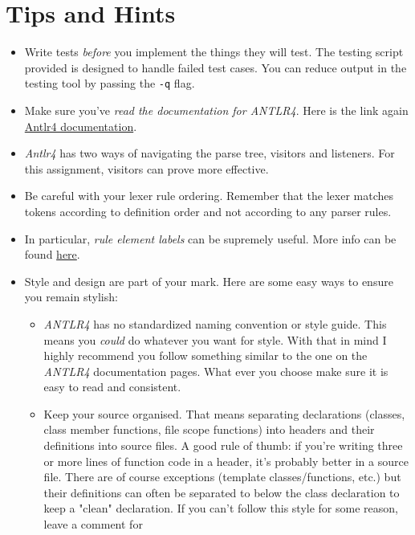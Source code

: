 \documentclass{article}
\newcommand{\code}[1]{\texttt{\textmd{#1}}}
\begin{document}
\section{Tips and Hints}
\begin{itemize}
  \item
    Write tests \textit{before} you implement the things they will test. The testing script
    provided is designed to handle failed test cases. You can reduce output in the testing tool by
    passing the \code{-q} flag.
  \item
    Make sure you've \textit{read the documentation for ANTLR4}. Here is the link again
    \href{https://github.com/antlr/antlr4/blob/master/doc/index.md} {Antlr4 documentation}.
  \item
    \textit{Antlr4} has two ways of navigating the parse tree, visitors and listeners. For this
    assignment, visitors can prove more effective.
  \item
    Be careful with your lexer rule ordering. Remember that the lexer matches tokens according to
    definition order and not according to any parser rules.
  \item
    In particular, \textit{rule element labels} can be supremely useful. More info can be found
    \href{https://github.com/antlr/antlr4/blob/master/doc/parser-rules.md\#alternative-labels}
    {here}.
  \item
    Style and design are part of your mark. Here are some easy ways to ensure you remain stylish:
    \begin{itemize}
    \item
      \textit{ANTLR4} has no standardized naming convention or style guide. This means you
      \textit{could} do whatever you want for style. With that in mind I highly recommend you
      follow something similar to the one on the \textit{ANTLR4} documentation pages. What ever you
      choose make sure it is easy to read and consistent.
    \item
      Keep your source organised. That means separating declarations (classes, class member
      functions, file scope functions) into headers and their definitions into source files. A
      good rule of thumb: if you're writing three or more lines of function code in a header, it's
      probably better in a source file. There are of course exceptions (template classes/functions,
      etc.) but their definitions can often be separated to below the class declaration to keep
      a "clean" declaration. If you can't follow this style for some reason, leave a comment for

\end{itemize}
\end{itemize}
\end{document}
